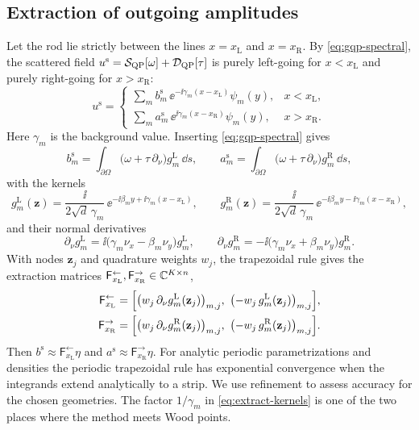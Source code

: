 \subsection{Extraction of outgoing amplitudes}\label{sec:extract}
Let the rod lie strictly between the lines $x=x_{\mathrm L}$ and $x=x_{\mathrm R}$.
By \eqref{eq:gqp-spectral}, the scattered field
$u^{\mathrm s}=\mathcal S_{\mathrm{QP}}[\omega]+\mathcal D_{\mathrm{QP}}[\tau]$ is purely left-going
for $x<x_{\mathrm L}$ and purely right-going for $x>x_{\mathrm R}$:
\[
  u^{\mathrm s}=\begin{cases}
  \sum_m b^{\mathrm s}_m\,\ee^{-\ii\gamma_m(x-x_{\mathrm L})}\psi_m(y), & x<x_{\mathrm L},\\[2pt]
  \sum_m a^{\mathrm s}_m\,\ee^{\ii\gamma_m(x-x_{\mathrm R})}\psi_m(y), & x>x_{\mathrm R}.
  \end{cases}
\]
Here $\gamma_m$ is the background value. Inserting \eqref{eq:gqp-spectral}
gives
\begin{equation}\label{eq:extract-exact}
  b^{\mathrm s}_m=\int_{\partial\Omega}\bigl(\omega+\tau\,\partial_{\nu}\bigr)g^{\mathrm L}_m\,\dd s,
  \qquad
  a^{\mathrm s}_m=\int_{\partial\Omega}\bigl(\omega+\tau\,\partial_{\nu}\bigr)g^{\mathrm R}_m\,\dd s,
\end{equation}
with the kernels
\begin{equation}\label{eq:extract-kernels}
  g^{\mathrm L}_m(\mathbf z)=\frac{\ii}{2\sqrt d\,\gamma_m}\,
     \ee^{-\ii\beta_my+\ii\gamma_m(x-x_{\mathrm L})},\qquad
  g^{\mathrm R}_m(\mathbf z)=\frac{\ii}{2\sqrt d\,\gamma_m}\,
     \ee^{-\ii\beta_my-\ii\gamma_m(x-x_{\mathrm R})},
\end{equation}
and their normal derivatives
\[
  \partial_\nu g^{\mathrm L}_m=\ii\bigl(\gamma_m\nu_x-\beta_m\nu_y\bigr)g^{\mathrm L}_m,
  \qquad
  \partial_\nu g^{\mathrm R}_m=-\ii\bigl(\gamma_m\nu_x+\beta_m\nu_y\bigr)g^{\mathrm R}_m .
\]
With nodes $\mathbf z_j$ and quadrature weights $w_j$, the trapezoidal rule
gives the extraction matrices $\mathsf F^{\leftarrow}_{x_{\mathrm L}},
\mathsf F^{\rightarrow}_{x_{\mathrm R}}\in\mathbb{C}^{K\times n}$,
\begin{equation}\label{eq:extract}
\begin{aligned}
  \mathsf F^{\leftarrow}_{x_{\mathrm L}}&=\Bigl[\bigl(w_j\,\partial_\nu g^{\mathrm L}_m(\mathbf z_j)\bigr)_{m,j},\
     \bigl(-w_j\,g^{\mathrm L}_m(\mathbf z_j)\bigr)_{m,j}\Bigr],\\
  \mathsf F^{\rightarrow}_{x_{\mathrm R}}&=\Bigl[\bigl(w_j\,\partial_\nu g^{\mathrm R}_m(\mathbf z_j)\bigr)_{m,j},\
     \bigl(-w_j\,g^{\mathrm R}_m(\mathbf z_j)\bigr)_{m,j}\Bigr].
\end{aligned}
\end{equation}
Then $b^{\mathrm s}\approx\mathsf F^{\leftarrow}_{x_{\mathrm L}}\eta$ and
$a^{\mathrm s}\approx\mathsf F^{\rightarrow}_{x_{\mathrm R}}\eta$. For analytic periodic parametrizations and densities the periodic trapezoidal
rule has exponential convergence when the integrands extend analytically
to a strip. We use refinement to assess accuracy for the chosen geometries. The
factor $1/\gamma_m$ in \eqref{eq:extract-kernels} is one of the two places
where the method meets Wood points.

